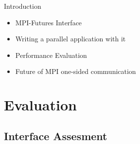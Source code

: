 \documentclass[svgnames]{beamer}
\begin{document}
\begin{frame}[fragile]{Introduction}
\begin{itemize}
	\item MPI-Futures Interface
	\item Writing a parallel application with it
	\item Performance Evaluation
	\item Future of MPI one-sided communication
\end{itemize}	 
\end{frame}
\section{Evaluation}
\subsection{Interface Assesment}
\end{document}
